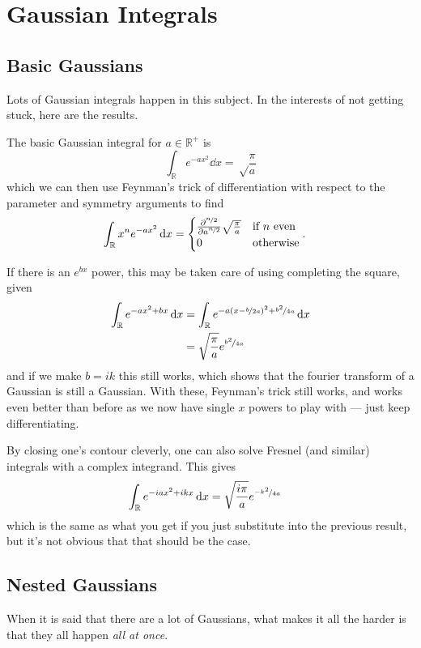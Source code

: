 \appendix
\chapter{Gaussian Integrals}
\section{Basic Gaussians}
Lots of Gaussian integrals happen in this subject. In the interests of not getting stuck, here are the results.

The basic Gaussian integral for \( a \in \mathbb{R}^+\) is
\[ \int_\mathbb{R} e^{-ax^2} \dd{x} = \sqrt\frac{\pi}{a} \] which we can then use Feynman's trick of differentiation with respect to the parameter and symmetry arguments to find
\begin{align*}
  \int_\mathbb{R} x^n e^{-ax^2} \dd{x} &= \begin{cases}
    \pdv[\nicefrac{n}{2}]{a} \sqrt\frac{\pi}{a} & \text{if \(n\) even}\\
    0 & \text{otherwise}
  \end{cases}.
\end{align*}

If there is an \(e^{bx} \) power, this may be taken care of using completing the square, given
\begin{align*}
  \int_\mathbb{R} e^{-ax^2+bx} \dd{x} &= \int_\mathbb{R} e^{-a(x - \nicefrac{b}{2a})^2+\nicefrac{b^2}{4a}} \dd{x}\\
  &= \sqrt\frac{\pi}{a} e^{\nicefrac{b^2}{4a}}
\end{align*}
and if we make \(b = ik\) this still works, which shows that the fourier transform of a Gaussian is still a Gaussian.
With these, Feynman's trick still works, and works even better than before as we now have single \(x\) powers to play with --- just keep differentiating.

By closing one's contour cleverly, one can also solve Fresnel (and similar) integrals with a complex integrand. This gives
\begin{align*}
  \int_\mathbb{R} e^{-iax^2+ikx} \dd{x}
  &= \sqrt\frac{i\pi}{a} e^{\nicefrac{-k^2}{4a}}
\end{align*}
which is the same as what you get if you just substitute into the previous result, but it's not obvious that that should be the case.

\section{Nested Gaussians}\label{sec:nested-gaussians}
When it is said that there are a lot of Gaussians, what makes it all the harder is that they all happen \emph{all at once}.

